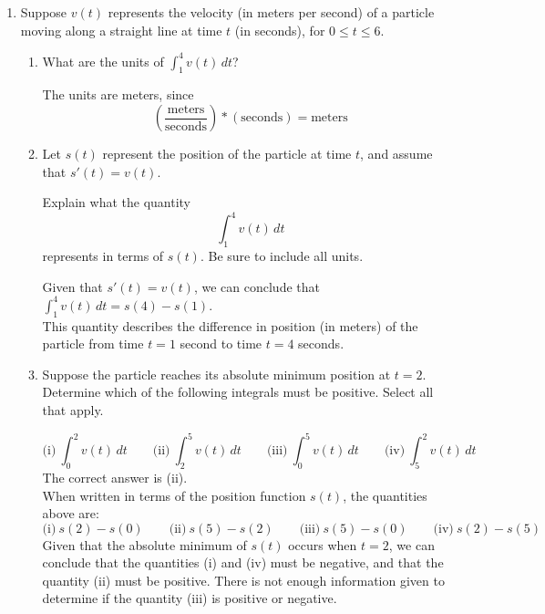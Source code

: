 \documentclass[11pt]{article}
\begin{document}
\begin{enumerate}

\newpage


\item Suppose $v(t)$ represents the velocity (in meters per second) of a particle moving along a straight line at time $t$ (in seconds), for $0 \leq t \leq 6$.

\begin{enumerate}

\item[(a)] What are the units of $\displaystyle \int_1^4 v(t)\,dt$?  

{\color{blue} The units are meters, since \[\left(\frac{\text{meters}}{\text{seconds}}\right)*(\text{seconds})=\text{meters}\]}

\item[(b)] Let $s(t)$ represent the position of the particle at time $t$, and assume that $s'(t) = v(t)$.  

Explain what the quantity
\[
\int_1^4 v(t)\,dt
\]
represents in terms of $s(t)$. Be sure to include all units.

{\color{blue} Given that $s'(t)=v(t)$, we can conclude that $\int_1^4v(t)\,dt=s(4)-s(1)$.\\ This quantity describes the difference in position (in meters) of the particle from time $t=1$ second to time $t=4$ seconds.}
\vspace{1cm}

\item[(c)] Suppose the particle reaches its absolute minimum position at $t = 2$.  
Determine which of the following integrals must be positive. Select all that apply.

\[
\text{(i)}\ \int_0^2 v(t)\,dt 
\qquad
\text{(ii)}\ \int_2^5 v(t)\,dt
\qquad
\text{(iii)}\ \int_0^5 v(t)\,dt
\qquad
\text{(iv)}\ \int_5^2 v(t)\,dt
\]
{\color{blue}The correct answer is (ii).\\ When written in terms of the position function $s(t)$, the quantities above are:
\[
\text{(i)}\ s(2)-s(0)
\qquad
\text{(ii)}\ s(5)-s(2)
\qquad
\text{(iii)}\ s(5)-s(0)
\qquad
\text{(iv)}\ s(2)-s(5)
\]
Given that the absolute minimum of $s(t)$ occurs when $t=2$, we can conclude that the quantities (i) and (iv) must be negative, and that the quantity (ii) must be positive. There is not enough information given to determine if the quantity (iii) is positive or negative.}


\end{enumerate}
\end{enumerate}
\end{document}
